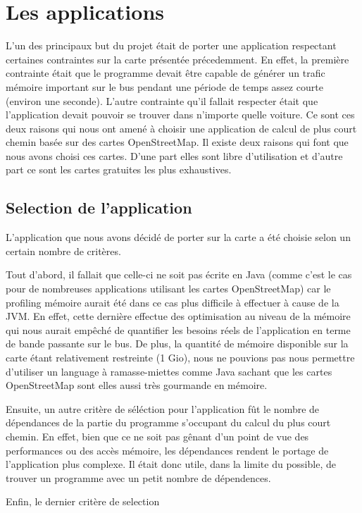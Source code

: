 \section{Les applications}

L'un des principaux but du projet était de porter une application respectant certaines contraintes sur la carte présentée précedemment. En effet, la première contrainte était que le programme devait être capable de générer un trafic mémoire important sur le bus pendant une période de temps assez courte (environ une seconde). L'autre contrainte qu'il fallait respecter était que l'application devait pouvoir se trouver dans n'importe quelle voiture. Ce sont ces deux raisons qui nous ont amené à choisir une application de calcul de plus court chemin basée sur des cartes OpenStreetMap. Il existe deux raisons qui font que nous avons choisi ces cartes. D'une part elles sont libre d'utilisation et d'autre part ce sont les cartes gratuites les plus exhaustives. 

\subsection{Selection de l'application}

L'application que nous avons décidé de porter sur la carte a été choisie selon un certain nombre de critères. 

Tout d'abord, il fallait que celle-ci ne soit pas écrite en Java (comme c'est le cas pour de nombreuses applications utilisant les cartes OpenStreetMap) car le profiling mémoire aurait été dans ce cas plus difficile à effectuer à cause de la JVM. En effet, cette dernière effectue des optimisation au niveau de la mémoire qui nous aurait empêché de quantifier les besoins réels de l'application en terme de bande passante sur le bus. De plus, la quantité de mémoire disponible sur la carte étant relativement restreinte (1 Gio), nous ne pouvions pas nous permettre d'utiliser un language à ramasse-miettes comme Java sachant que les cartes OpenStreetMap sont elles aussi très gourmande en mémoire.

Ensuite, un autre critère de séléction pour l'application fût le nombre de dépendances de la partie du programme s'occupant du calcul du plus court chemin. En effet, bien que ce ne soit pas gênant d'un point de vue des performances ou des accès mémoire, les dépendances rendent le portage de l'application plus complexe. Il était donc utile, dans la limite du possible, de trouver un programme avec un petit nombre de dépendences.

Enfin, le dernier critère de selection
